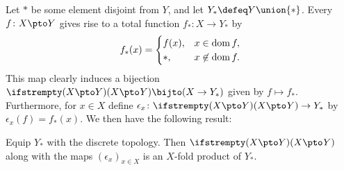 \newcommand{\ev}[1][]{\epsilon_{#1}}

Let $*$ be some element disjoint from $Y$, and let $Y_* \defeq Y \union \{*\}$. Every $f \colon X \pto Y$ gives rise to a total function $f_* \colon X \to Y_*$ by
%
\begin{equation*}
    f_*(x) =
    \begin{cases}
        f(x), & x \in \operatorname{dom}{f}, \\
        *,    & x \not\in \operatorname{dom}{f}.
    \end{cases}
\end{equation*}
%
This map clearly induces a bijection $\pmaps{X}{Y} \bijto \tmaps{X}{Y_*}$ given by $f \mapsto f_*$. Furthermore, for $x \in X$ define $\ev[x] \colon \pmaps{X}{Y} \to Y_*$ by $\ev[x](f) = f_*(x)$. We then have the following result:

\begin{proposition}
    Equip $Y_*$ with the discrete topology. Then $\pmaps{X}{Y}$ along with the maps $(\ev[x])_{x \in X}$ is an $X$-fold product of $Y_*$.
\end{proposition}


